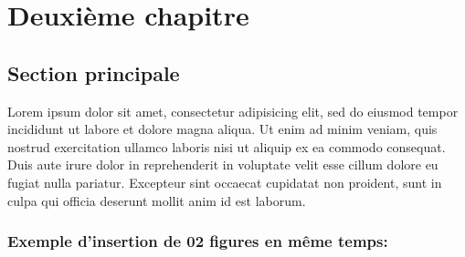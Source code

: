 \chapter{Deuxième chapitre}

\section{Section principale}
Lorem ipsum dolor sit amet, consectetur adipisicing elit, sed do eiusmod
tempor incididunt ut labore et dolore magna aliqua. Ut enim ad minim veniam,
quis nostrud exercitation ullamco laboris nisi ut aliquip ex ea commodo
consequat. Duis aute irure dolor in reprehenderit in voluptate velit esse
cillum dolore eu fugiat nulla pariatur. Excepteur sint occaecat cupidatat non
proident, sunt in culpa qui officia deserunt mollit anim id est laborum.

\subsection{Exemple d'insertion de 02 figures en même temps:}

